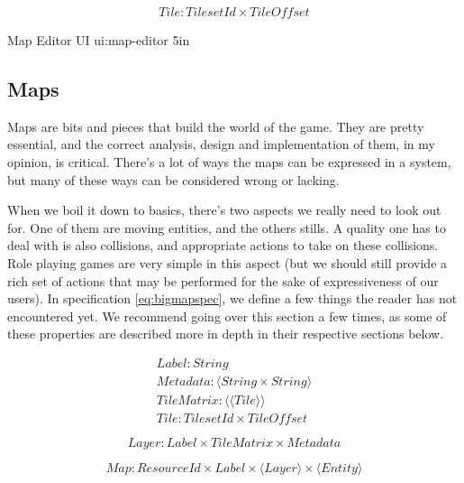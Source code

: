 \begin{equation}
  \begin{split} \label{eq:tile-explain}
  Tile\colon TilesetId \times TileOffset
\end{split}
\end{equation}

%
       {Map Editor UI}%
       {ui:map-editor}%
       {5in}

\subsection{Maps}

Maps are bits and pieces that build the world of the game. They are pretty
essential, and the correct analysis, design and implementation of them, in my
opinion, is critical. There's a lot of ways the maps can be expressed in a
system, but many of these ways can be considered wrong or lacking.

When we boil it down to basics, there's two aspects we really need to look out
for. One of them are moving entities, and the others stills. A quality one has
to deal with is also collisions, and appropriate actions to take on these
collisions. Role playing games are very simple in this aspect (but we should
still provide a rich set of actions that may be performed for the sake of
expressiveness of our users). In specification \ref{eq:bigmapspec}, we define a
few things the reader has not encountered yet. We recommend going over this
section a few times, as some of these properties are described more in depth in
their respective sections below.

\begin{equation}
\begin{split} \label{eq:bigmapspec}
Label\colon String \\
Metadata\colon \langle String \times String \rangle \\
TileMatrix\colon \langle \langle Tile \rangle \rangle \\
Tile\colon TilesetId \times TileOffset
\end{split}
\end{equation}

\begin{equation}
Layer\colon Label \times TileMatrix \times Metadata
\end{equation}

\begin{equation}
Map\colon ResourceId \times Label \times \langle Layer \rangle \times \langle Entity \rangle
\end{equation}

